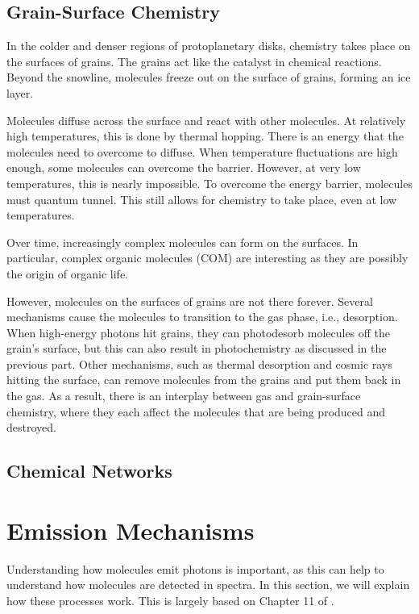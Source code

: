 \documentclass[oneside, single, authoryear, semicolon, 12pt]{lion-msc}
\newcommand{\4}{$_4$}
\newcommand{\3}{$_3$}
\newcommand{\2}{$_2$}
\begin{document}
\subsection{Grain-Surface Chemistry}
In the colder and denser regions of protoplanetary disks, chemistry takes place on the surfaces of grains.  The grains act like the catalyst in chemical reactions. Beyond the snowline, molecules freeze out on the surface of grains, forming an ice layer. 

Molecules diffuse across the surface and react with other molecules. At relatively high temperatures, this is done by thermal hopping. There is an energy that the molecules need to overcome to diffuse. When temperature fluctuations are high enough, some molecules can overcome the barrier. However, at very low temperatures, this is nearly impossible. To overcome the energy barrier, molecules must quantum tunnel. This still allows for chemistry to take place, even at low temperatures. 

Over time, increasingly complex molecules can form on the surfaces. In particular, complex organic molecules (COM) are interesting as they are possibly the origin of organic life. 

However, molecules on the surfaces of grains are not there forever. Several mechanisms cause the molecules to transition to the gas phase, i.e., desorption. When high-energy photons hit grains, they can photodesorb molecules off the grain's surface, but this can also result in photochemistry as discussed in the previous part. Other mechanisms, such as thermal desorption and cosmic rays hitting the surface, can remove molecules from the grains and put them back in the gas. As a result, there is an interplay between gas and grain-surface chemistry, where they each affect the molecules that are being produced and destroyed.

\subsection{Chemical Networks}

\section{Emission Mechanisms}
Understanding how molecules emit photons is important, as this can help to understand how molecules are detected in spectra. In this section, we will explain how these processes work. This is largely based on Chapter 11 of \cite{1979rpa..book.....R}. 
\end{document}
